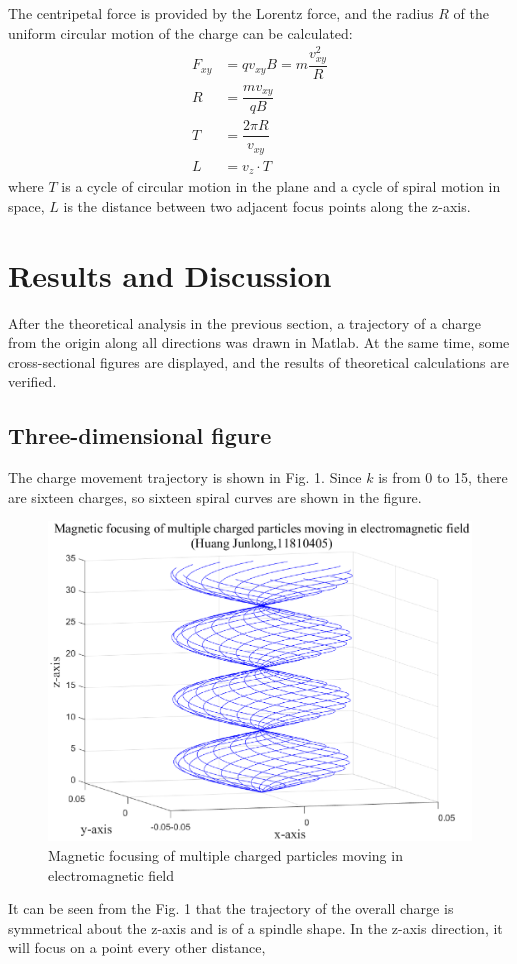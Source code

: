 \documentclass[journal,twocolumn,letterpaper]{IEEEJERM}
\begin{document}
The centripetal force is provided by the Lorentz force, and the radius $ R $ of the uniform circular motion of the charge can be calculated:
\begin{align}
F_{xy}&=qv_{xy}B=m\dfrac{v_{xy}^2}{R}\\
R&=\dfrac{mv_{xy}}{qB} \\
T&=\dfrac{2\pi R}{v_{xy}}\\
L&=v_z\cdot T
\end{align}
where $ T $ is a cycle of circular motion in the plane and a cycle of spiral motion in space, $L  $ is  the distance between two adjacent focus points along the z-axis.


\section{Results and Discussion}
After the theoretical analysis in the previous section, a trajectory of a charge from the origin along all directions was drawn in Matlab. At the same time, some cross-sectional figures are displayed, and the results of theoretical calculations are verified.

\subsection{Three-dimensional figure}
The charge movement trajectory is shown in Fig. 1. Since $ k $ is from 0 to 15, there are sixteen charges, so sixteen spiral curves are shown in the figure.
\begin{figure}[H]   
	\centering	        \includegraphics[width=0.9\linewidth]{Fig-1.eps}
	\caption{Magnetic focusing of multiple charged particles moving in electromagnetic field}	  
	\label{fig1} 
\end{figure}
It can be seen from the Fig. 1 that the trajectory of the overall charge is symmetrical about the z-axis and is of a spindle shape. In the z-axis direction, it will focus on a point every other distance,
\end{document}
